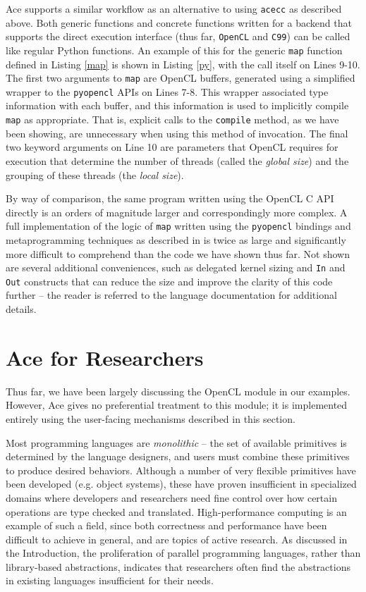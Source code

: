 \documentclass[10pt, conference, compsocconf]{IEEEtran}
\begin{document}
Ace supports a similar workflow as an alternative to using \verb|acecc| as described above. Both generic functions and concrete functions written for a backend that supports the direct execution interface (thus far, \verb|OpenCL| and \verb|C99|) can be called like regular Python functions. An example of this for the generic \verb|map| function defined in Listing \ref{map} is shown in Listing \ref{py}, with the call itself on Lines 9-10. The first two arguments to \verb|map| are OpenCL buffers, generated using a simplified wrapper to the \verb|pyopencl| APIs on Lines 7-8. This wrapper associated type information with each buffer, and this information is used to implicitly compile \verb|map| as appropriate. That is, explicit calls to the \verb|compile| method, as we have been showing, are unnecessary when using this method of invocation. The final two keyword arguments on Line 10 are parameters that OpenCL requires for execution that determine the number of threads (called the {\em global size}) and the grouping of these threads (the {\em local size}). 

By way of comparison, the same program written using the OpenCL C API directly is an orders of magnitude larger and correspondingly more complex. A full implementation of the logic of \verb|map| written using the \verb|pyopencl| bindings and metaprogramming techniques as described in \cite{pyopencl} is twice as large and significantly more difficult to comprehend than the code we have shown thus far. Not shown are several additional conveniences, such as delegated kernel sizing and \verb|In| and \verb|Out| constructs that can reduce the size and improve the clarity of this code further -- the reader is referred to the language documentation for additional details.

\section{Ace for Researchers}
Thus far, we have been largely discussing the OpenCL module in our examples. However, Ace gives no preferential treatment to this module; it is implemented entirely using the user-facing mechanisms described in this section.

Most programming languages are {\em monolithic} -- the set of available primitives is determined by the language designers, and users must combine these primitives to produce desired behaviors. Although a number of very flexible primitives have been developed (e.g. object systems), these have proven insufficient in specialized domains where developers and researchers need fine control over how certain operations are type checked and translated. High-performance computing is an example of such a field, since both correctness and performance have been difficult to achieve in general, and are topics of active research. As discussed in the Introduction, the proliferation of parallel programming languages, rather than library-based abstractions, indicates that researchers often find the abstractions in existing languages insufficient for their needs.
\end{document}
